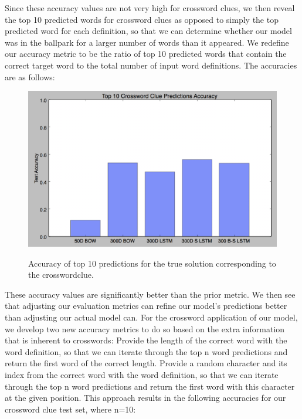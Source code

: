 \documentclass{article} %
\begin{document}
Since these accuracy values are not very high for crossword clues, we then reveal the top 10 predicted words for crossword clues as opposed to simply the top predicted word for each definition, so that we can determine whether our model was in the ballpark for a larger number of words than it appeared. We redefine our accuracy metric to be the ratio of top 10 predicted words that contain the correct target word to the total number of input word definitions. The accuracies are as follows:

\begin{figure}
	\includegraphics{top10cross.png}
	\label{Fig 3}
	\caption{Accuracy of top 10 predictions for the true solution corresponding to the crosswordclue.}
\end{figure}

These accuracy values are significantly better than the prior metric. We then see that adjusting our evaluation metrics can refine our model’s predictions better than adjusting our actual model can. For the crossword application of our model, we develop two new accuracy metrics to do so based on the extra information that is inherent to crosswords:
Provide the length of the correct word with the word definition, so that we can iterate through the top n word predictions and return the first word of the correct length.
Provide a random character and its index from the correct word with the word definition, so that we can iterate through the top n word predictions and return the first word with this character at the given position. 
This approach results in the following accuracies for our crossword clue test set, where n=10:
\end{document}
